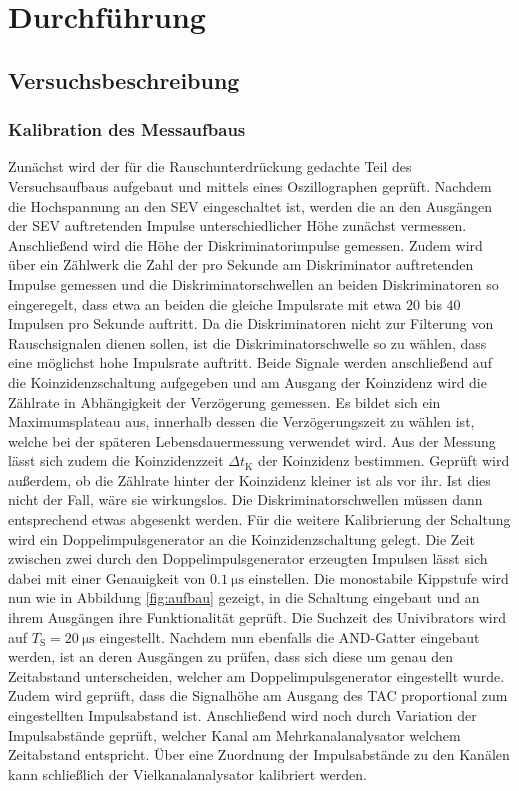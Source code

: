 \section{Durchführung}
\label{sec:Durchführung}



\subsection{Versuchsbeschreibung}
\label{sec:Versuchsbeschreibung}
\subsubsection{Kalibration des Messaufbaus}
Zunächst wird der für die Rauschunterdrückung gedachte Teil des Versuchsaufbaus aufgebaut und mittels eines Oszillographen geprüft.
Nachdem die Hochspannung an den SEV eingeschaltet ist, werden die an den Ausgängen der SEV auftretenden Impulse unterschiedlicher Höhe zunächst vermessen.
Anschließend wird die Höhe der Diskriminatorimpulse gemessen. Zudem wird über ein Zählwerk die Zahl der pro Sekunde am Diskriminator auftretenden Impulse gemessen und die Diskriminatorschwellen an beiden Diskriminatoren so eingeregelt, dass etwa an beiden die gleiche Impulsrate mit etwa $20$ bis $40$ Impulsen pro Sekunde auftritt.
Da die Diskriminatoren nicht zur Filterung von Rauschsignalen dienen sollen, ist die Diskriminatorschwelle so zu wählen, dass eine möglichst hohe Impulsrate auftritt.
Beide Signale werden anschließend auf die Koinzidenzschaltung aufgegeben und am Ausgang der Koinzidenz wird die Zählrate  in Abhängigkeit der Verzögerung gemessen. Es bildet sich ein Maximumsplateau aus, innerhalb dessen die Verzögerungszeit zu wählen ist, welche bei der späteren Lebensdauermessung verwendet wird.
Aus der Messung lässt sich zudem die Koinzidenzzeit $\Delta t_{\mathrm{K}}$ der Koinzidenz bestimmen.
Geprüft wird außerdem, ob die Zählrate hinter der Koinzidenz kleiner ist als vor ihr. Ist dies nicht der Fall, wäre sie wirkungslos. Die Diskriminatorschwellen müssen dann entsprechend etwas abgesenkt werden.
Für die weitere Kalibrierung der Schaltung wird ein Doppelimpulsgenerator an die Koinzidenzschaltung gelegt.
Die Zeit zwischen zwei durch den Doppelimpulsgenerator erzeugten Impulsen lässt sich dabei mit einer Genauigkeit von $\SI{0.1}{\micro\second}$ einstellen.
Die monostabile Kippstufe wird nun wie in Abbildung \ref{fig:aufbau} gezeigt, in die Schaltung eingebaut und an ihrem Ausgängen ihre Funktionalität geprüft. Die Suchzeit des Univibrators wird auf $T_{\mathrm{S}}=\SI{20}{\micro\second}$ eingestellt.
Nachdem nun ebenfalls die AND-Gatter eingebaut werden, ist an deren Ausgängen zu prüfen, dass sich diese um genau den Zeitabstand unterscheiden, welcher am Doppelimpulsgenerator eingestellt wurde.
Zudem wird geprüft, dass die Signalhöhe am Ausgang des TAC proportional zum eingestellten Impulsabstand ist.
Anschließend wird noch durch Variation der Impulsabstände geprüft, welcher Kanal am Mehrkanalanalysator welchem Zeitabstand entspricht. Über eine Zuordnung der Impulsabstände zu den Kanälen kann schließlich der Vielkanalanalysator kalibriert werden.

